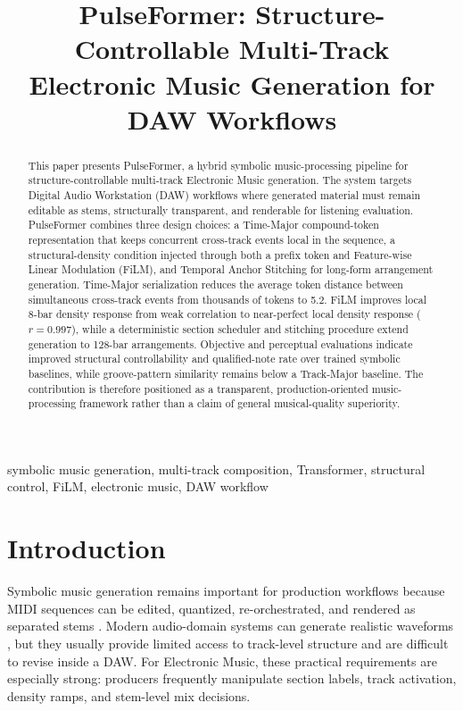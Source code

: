 \documentclass[conference]{conference-latex-template_10-17-19/IEEEtran}
\begin{document}
\title{PulseFormer: Structure-Controllable Multi-Track Electronic Music Generation for DAW Workflows}

\author{}

\maketitle

\begin{abstract}
This paper presents PulseFormer, a hybrid symbolic music-processing pipeline for structure-controllable multi-track Electronic Music generation. The system targets Digital Audio Workstation (DAW) workflows where generated material must remain editable as stems, structurally transparent, and renderable for listening evaluation. PulseFormer combines three design choices: a Time-Major compound-token representation that keeps concurrent cross-track events local in the sequence, a structural-density condition injected through both a prefix token and Feature-wise Linear Modulation (FiLM), and Temporal Anchor Stitching for long-form arrangement generation. Time-Major serialization reduces the average token distance between simultaneous cross-track events from thousands of tokens to 5.2. FiLM improves local 8-bar density response from weak correlation to near-perfect local density response ($r=0.997$), while a deterministic section scheduler and stitching procedure extend generation to 128-bar arrangements. Objective and perceptual evaluations indicate improved structural controllability and qualified-note rate over trained symbolic baselines, while groove-pattern similarity remains below a Track-Major baseline. The contribution is therefore positioned as a transparent, production-oriented music-processing framework rather than a claim of general musical-quality superiority.
\end{abstract}

\begin{IEEEkeywords}
symbolic music generation, multi-track composition, Transformer, structural control, FiLM, electronic music, DAW workflow
\end{IEEEkeywords}

\section{Introduction}
Symbolic music generation remains important for production workflows because MIDI sequences can be edited, quantized, re-orchestrated, and rendered as separated stems \cite{huang2019music,dong2020muspy}. Modern audio-domain systems can generate realistic waveforms \cite{copet2023simple,agostinelli2023musiclm}, but they usually provide limited access to track-level structure and are difficult to revise inside a DAW. For Electronic Music, these practical requirements are especially strong: producers frequently manipulate section labels, track activation, density ramps, and stem-level mix decisions.
\end{document}
